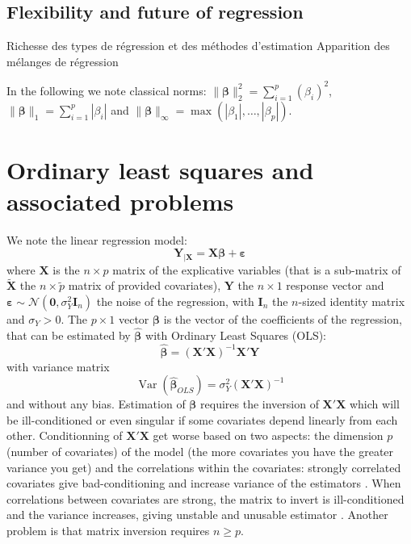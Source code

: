 \documentclass[12pt,a4paper]{report}
\begin{document}
			
		\subsection{Flexibility and future of regression}
			Richesse des types de régression et des méthodes d'estimation
			Apparition des mélanges de régression

	
In the following we note classical norms: $\parallel\boldsymbol{\beta}\parallel_2^2=\sum_{i=1}^p(\beta_i)^2$, $\parallel\boldsymbol{\beta} \parallel_1=\sum_{i=1}^p|\beta_i| $ and $\parallel\boldsymbol{\beta} \parallel_{\infty}=\operatorname{max}(|\beta_1|,\dots,|\beta_p|)$.
	\section{Ordinary least squares and associated problems}\label{sectionOLS}		%

We note the linear regression model:
\begin{equation}
		\boldsymbol{Y}_{|\boldsymbol{X}}=\boldsymbol{X}\boldsymbol{\beta} + \boldsymbol{\varepsilon} \label{regressionsimple}
	\end{equation}
	where $\boldsymbol{X}$ is the $n\times p$ matrix of the explicative variables (that is a sub-matrix of $\tilde{\boldsymbol{X}}$ the $n\times \tilde{p}$ matrix of provided covariates), $\boldsymbol{Y}$ the  $n\times 1$ response vector and $\boldsymbol{\varepsilon} \sim \mathcal{N}(\boldsymbol{0},\sigma_Y^2\boldsymbol{I}_n)$ the noise of the regression, with $\boldsymbol{I}_n$ the $n$-sized identity matrix and $\sigma_Y >0$. The $p\times 1$ vector $\boldsymbol{\beta}$ is the vector of the coefficients of the regression, that can be estimated by $\hat{\boldsymbol{\beta}}$ with Ordinary Least Squares (\textsc{OLS}): %
	\begin{equation}
		\boldsymbol{\hat{\beta}}=\left(\boldsymbol{X}'\boldsymbol{X} \right) ^{-1}\boldsymbol{X}'\boldsymbol{Y}
	\end{equation}
	with variance matrix
	\begin{equation}
		\operatorname{Var}(\hat{\boldsymbol{\beta}}_{OLS})=\sigma_Y^2\left(\boldsymbol{X}'\boldsymbol{X} \right) ^{-1} \label{eqOLS}
	\end{equation}
	and without any bias.
	Estimation of $\boldsymbol{\beta}$ requires the inversion of $\boldsymbol{X}'\boldsymbol{X}$ which will be ill-conditioned or even singular if some covariates depend linearly from each other. 
Conditionning of $\boldsymbol{X}'\boldsymbol{X}$ get worse based on two aspects: the dimension $p$ (number of covariates) of the model (the more covariates you have the greater variance you get)
	 and the correlations within the covariates: strongly correlated covariates give bad-conditioning and increase variance of the estimators .
	When correlations between covariates are strong, the matrix to invert is ill-conditioned and the variance increases, giving unstable and unusable estimator \cite{hoerl1970ridge}.
	Another problem is that matrix inversion requires $n\geq p$. 	
\end{document}
